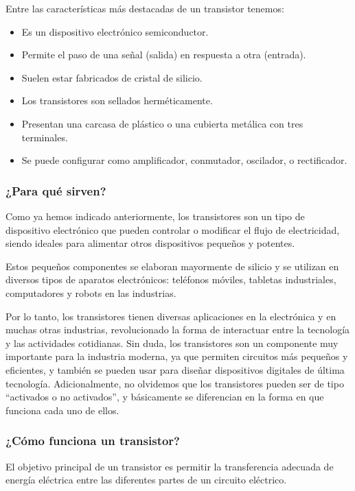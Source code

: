 Entre las características más destacadas de un transistor tenemos:
\begin{itemize}
    \item Es un dispositivo electrónico semiconductor.
    \item Permite el paso de una señal (salida) en respuesta a otra (entrada).
    \item Suelen estar fabricados de cristal de silicio.
    \item Los transistores son sellados herméticamente.
    \item Presentan una carcasa de plástico o una cubierta metálica con tres terminales.
    \item Se puede configurar como amplificador, conmutador, oscilador, o rectificador.
\end{itemize}

\subsubsection{¿Para qué sirven?}

Como ya hemos indicado anteriormente, los transistores son un tipo de dispositivo electrónico que pueden controlar o modificar el flujo de electricidad, siendo ideales para alimentar otros dispositivos pequeños y potentes.

Estos pequeños componentes se elaboran mayormente de silicio y se utilizan en diversos tipos de aparatos electrónicos: teléfonos móviles, tabletas industriales, computadores y robots en las industrias.

Por lo tanto, los transistores tienen diversas aplicaciones en la electrónica y en muchas otras industrias, revolucionado la forma de interactuar entre la tecnología y las actividades cotidianas.
Sin duda, los transistores son un componente muy importante para la industria moderna, ya que permiten circuitos más pequeños y eficientes, y también se pueden usar para diseñar dispositivos digitales de última tecnología.
Adicionalmente, no olvidemos que los transistores pueden ser de tipo “activados o no activados”, y básicamente se diferencian en la forma en que funciona cada uno de ellos.

\subsubsection{¿Cómo funciona un transistor?}
El objetivo principal de un transistor es permitir la transferencia adecuada de energía eléctrica entre las diferentes partes de un circuito eléctrico.

